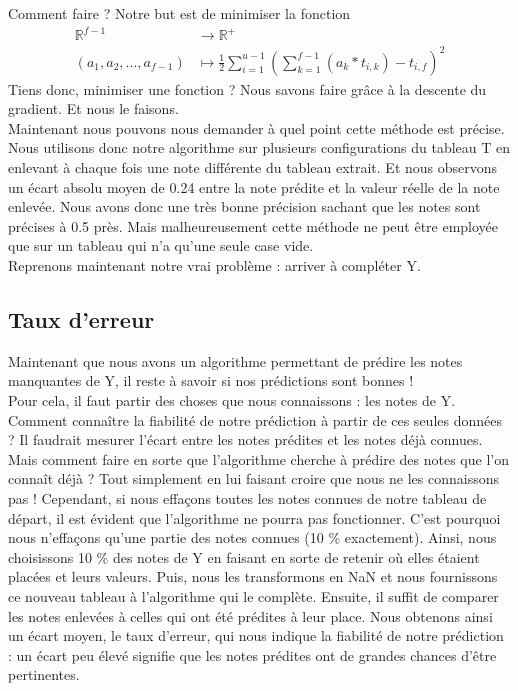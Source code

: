 \documentclass[a4paper,10pt]{article}
\begin{document}
Comment faire ? Notre but est de minimiser la fonction
\begin{align*}
\mathbb{R}^{f-1}&\longrightarrow \mathbb{R}^+\\ 
(a_1, a_2, ..., a_{f-1})&\longmapsto \frac{1}{2}\sum_{i = 1}^{u - 1} (\sum_{k = 1}^{f-1} (a_k * t_{i, k}) - t_{i, f})^2
\end{align*}
Tiens donc, minimiser une fonction ? Nous savons faire grâce à la descente du gradient. Et nous le faisons.\\

Maintenant nous pouvons nous demander à quel point cette méthode est précise. Nous utilisons donc notre algorithme sur plusieurs configurations du tableau T en enlevant à chaque fois une note différente du tableau extrait. Et nous observons un écart absolu moyen de 0.24 entre la note prédite et la valeur réelle de la note enlevée. Nous avons donc une très bonne précision sachant que les notes sont précises à 0.5 près. Mais malheureusement cette méthode ne peut être employée que sur un tableau qui n'a qu'une seule case vide.\\

Reprenons maintenant notre vrai problème : arriver à compléter Y.

\subsection{Taux d'erreur}

Maintenant que nous avons un algorithme permettant de prédire les notes manquantes de Y, il reste à savoir si nos prédictions sont bonnes !\\

Pour cela, il faut partir des choses que nous connaissons : les notes de Y. 
Comment connaître la fiabilité de notre prédiction à partir de ces seules données ?  
Il faudrait mesurer l'écart entre les notes prédites et les notes déjà connues.
Mais comment faire en sorte que l'algorithme cherche à prédire des notes que l'on connaît déjà ?
Tout simplement en lui faisant croire que nous ne les connaissons pas !
Cependant, si nous effaçons toutes les notes connues de notre tableau de départ, il est évident que l'algorithme ne pourra pas fonctionner.
C'est pourquoi nous n'effaçons qu'une partie des notes connues (10 \% exactement). 
Ainsi, nous choisissons 10 \% des notes de Y en faisant en sorte de retenir où elles étaient placées et leurs valeurs. 
Puis, nous les transformons en NaN et nous fournissons ce nouveau tableau à l'algorithme qui le complète.
Ensuite, il suffit de comparer les notes enlevées à celles qui ont été prédites à leur place. 
Nous obtenons ainsi un écart moyen, le taux d'erreur, qui nous indique la fiabilité de notre prédiction : 
un écart peu élevé signifie que les notes prédites ont de grandes chances d'être pertinentes.
\end{document}
